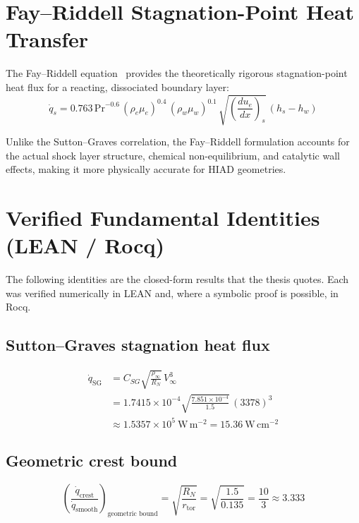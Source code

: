 \section{Fay--Riddell Stagnation-Point Heat Transfer}

The Fay--Riddell equation~\cite{fay1958stagnation} provides the theoretically rigorous stagnation-point heat flux for a reacting, dissociated boundary layer:
\begin{equation}
    \dot{q}_s = 0.763 \, \text{Pr}^{-0.6} \, (\rho_e \mu_e)^{0.4} \, (\rho_w \mu_w)^{0.1} \, \sqrt{\left(\frac{du_e}{dx}\right)_s} \, (h_s - h_w)
    \label{eq:fay_riddell}
\end{equation}

\noindent Unlike the Sutton--Graves correlation, the Fay--Riddell formulation accounts for the actual shock layer structure, chemical non-equilibrium, and catalytic wall effects, making it more physically accurate for HIAD geometries.

\section{Verified Fundamental Identities (LEAN / Rocq)}

The following identities are the closed-form results that the thesis quotes. Each was
verified numerically in LEAN and, where a symbolic proof is possible, in Rocq.

\subsection{Sutton--Graves stagnation heat flux}
\begin{equation}
    \begin{split}
    \dot{q}_{\text{SG}} &= C_{SG}\sqrt{\frac{\rho_\infty}{R_N}}\,V_\infty^3 \\
    &= 1.7415\times10^{-4}\sqrt{\frac{7.851\times10^{-4}}{1.5}}\,(3378)^3 \\
    &\approx 1.5357\times10^{5}\ \mathrm{W\,m^{-2}} = 15.36\ \mathrm{W\,cm^{-2}}
    \end{split}
\end{equation}

\subsection{Geometric crest bound}
\begin{equation}
    \left(\frac{\dot q_{\text{crest}}}{\dot q_{\text{smooth}}}\right)_{\text{geometric bound}}
    = \sqrt{\frac{R_N}{r_{\text{tor}}}}
    = \sqrt{\frac{1.5}{0.135}}
    = \frac{10}{3} \approx 3.333
\end{equation}

